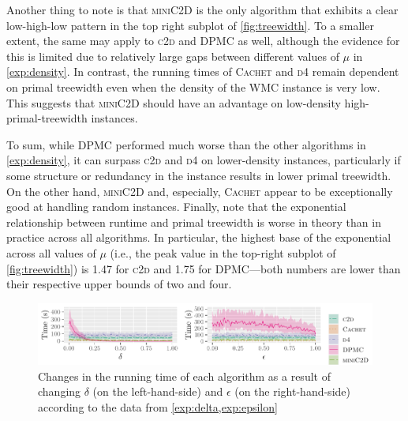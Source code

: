 \documentclass{article}
\theoremstyle{definition}
\theoremstyle{remark}
\begin{document}
Another thing to note is that \textsc{miniC2D} \cite{DBLP:conf/ijcai/OztokD15}
is the only algorithm that exhibits a clear low-high-low pattern in the top
right subplot of \cref{fig:treewidth}. To a smaller extent, the same may apply
to \textsc{c2d} \cite{DBLP:conf/ecai/Darwiche04} and \textsc{DPMC}
\cite{DBLP:conf/cp/DudekPV20} as well, although the evidence for this is limited
due to relatively large gaps between different values of $\mu$ in
\cref{exp:density}. In contrast, the running times of \textsc{Cachet}
\cite{DBLP:conf/sat/SangBBKP04} and \textsc{d4}
\cite{DBLP:conf/ijcai/LagniezM17} remain dependent on primal treewidth even when
the density of the \textsf{WMC} instance is very low. This suggests that
\textsc{miniC2D} should have an advantage on low-density high-primal-treewidth
instances.

To sum, while \textsc{DPMC} \cite{DBLP:conf/cp/DudekPV20} performed much worse
than the other algorithms in \cref{exp:density}, it can surpass \textsc{c2d}
\cite{DBLP:conf/ecai/Darwiche04} and \textsc{d4}
\cite{DBLP:conf/ijcai/LagniezM17} on lower-density instances, particularly if
some structure or redundancy in the instance results in lower primal treewidth.
On the other hand, \textsc{miniC2D} \cite{DBLP:conf/ijcai/OztokD15} and,
especially, \textsc{Cachet} \cite{DBLP:conf/sat/SangBBKP04} appear to be
exceptionally good at handling random instances. Finally, note that the
exponential relationship between runtime and primal treewidth is worse in theory
than in practice across all algorithms. In particular, the highest base of the
exponential across all values of $\mu$ (i.e., the peak value in the top-right
subplot of \cref{fig:treewidth}) is 1.47 for \textsc{c2d} and 1.75 for
\textsc{DPMC}---both numbers are lower than their respective upper bounds of two
and four.

\begin{figure}
  \centering
  \includegraphics{delta_epsilon}
  \caption{Changes in the running time of each algorithm as a result of changing
    $\delta$ (on the left-hand-side) and $\epsilon$ (on the right-hand-side)
    according to the data from \cref{exp:delta,exp:epsilon}}
  \label{fig:delta_epsilon}
\end{figure}
\end{document}
